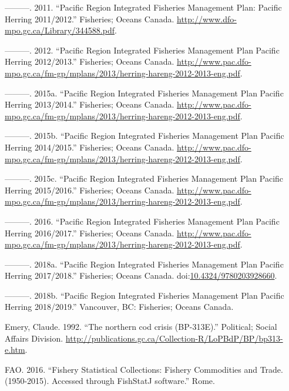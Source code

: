 \documentclass[]{article}
\theoremstyle{definition}
\theoremstyle{definition}
\theoremstyle{definition}
\theoremstyle{remark}
\begin{document}
\hypertarget{ref-FisheriesandOceansCanada2011}{}
---------. 2011. ``Pacific Region Integrated Fisheries Management Plan:
Pacific Herring 2011/2012.'' Fisheries; Oceans Canada.
\url{http://www.dfo-mpo.gc.ca/Library/344588.pdf}.

\hypertarget{ref-DFO2015a}{}
---------. 2012. ``Pacific Region Integrated Fisheries Management Plan
Pacific Herring 2012/2013.'' Fisheries; Oceans Canada.
\url{http://www.pac.dfo-mpo.gc.ca/fm-gp/mplans/2013/herring-hareng-2012-2013-eng.pdf}.

\hypertarget{ref-DFO2015b}{}
---------. 2015a. ``Pacific Region Integrated Fisheries Management Plan
Pacific Herring 2013/2014.'' Fisheries; Oceans Canada.
\url{http://www.pac.dfo-mpo.gc.ca/fm-gp/mplans/2013/herring-hareng-2012-2013-eng.pdf}.

\hypertarget{ref-DFO2015c}{}
---------. 2015b. ``Pacific Region Integrated Fisheries Management Plan
Pacific Herring 2014/2015.'' Fisheries; Oceans Canada.
\url{http://www.pac.dfo-mpo.gc.ca/fm-gp/mplans/2013/herring-hareng-2012-2013-eng.pdf}.

\hypertarget{ref-DFO2015d}{}
---------. 2015c. ``Pacific Region Integrated Fisheries Management Plan
Pacific Herring 2015/2016.'' Fisheries; Oceans Canada.
\url{http://www.pac.dfo-mpo.gc.ca/fm-gp/mplans/2013/herring-hareng-2012-2013-eng.pdf}.

\hypertarget{ref-DFO2015e}{}
---------. 2016. ``Pacific Region Integrated Fisheries Management Plan
Pacific Herring 2016/2017.'' Fisheries; Oceans Canada.
\url{http://www.pac.dfo-mpo.gc.ca/fm-gp/mplans/2013/herring-hareng-2012-2013-eng.pdf}.

\hypertarget{ref-Report2009}{}
---------. 2018a. ``Pacific Region Integrated Fisheries Management Plan
Pacific Herring 2017/2018.'' Fisheries; Oceans Canada.
doi:\href{https://doi.org/10.4324/9780203928660}{10.4324/9780203928660}.

\hypertarget{ref-DFO2018}{}
---------. 2018b. ``Pacific Region Integrated Fisheries Management Plan
Pacific Herring 2018/2019.'' Vancouver, BC: Fisheries; Oceans Canada.

\hypertarget{ref-Emery1992a}{}
Emery, Claude. 1992. ``The northern cod crisis (BP-313E).'' Political;
Social Affairs Division.
\url{http://publications.gc.ca/Collection-R/LoPBdP/BP/bp313-e.htm}.

\hypertarget{ref-FAO2016a}{}
FAO. 2016. ``Fishery Statistical Collections: Fishery Commodities and
Trade. (1950-2015). Accessed through FishStatJ software.'' Rome.
\end{document}
